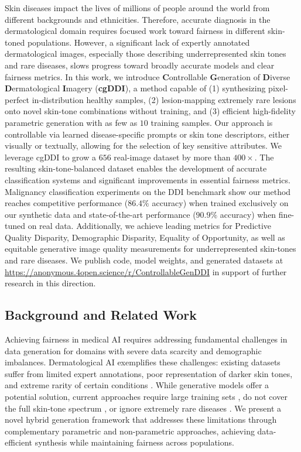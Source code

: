 \documentclass[11pt]{ucthesis}
\begin{document}
Skin diseases impact the lives of millions of people around the world from different backgrounds and ethnicities. Therefore, accurate diagnosis in the dermatological domain requires focused work toward fairness in different skin-toned populations. However, a significant lack of expertly annotated dermatological images, especially those describing underrepresented skin tones and rare diseases, slows progress toward broadly accurate models and clear fairness metrics. In this work, we introduce \textbf{C}ontrollable \textbf{G}eneration of \textbf{D}iverse \textbf{D}ermatological \textbf{I}magery (\textbf{cgDDI}), a method capable of (1) synthesizing pixel-perfect in-distribution healthy samples, (2) lesion-mapping extremely rare lesions onto novel skin-tone combinations without training, and (3) efficient high-fidelity parametric generation with as few as $10$ training samples. Our approach is controllable via learned disease-specific prompts or skin tone descriptors, either visually or textually, allowing for the selection of key sensitive attributes. We leverage cgDDI to grow a $656$ real-image dataset by more than $400\times$. The resulting skin-tone-balanced dataset enables the development of accurate classification systems and significant improvements in essential fairness metrics. Malignancy classification experiments on the DDI benchmark show our method reaches competitive performance ($86.4\%$ accuracy) when trained exclusively on our synthetic data and state-of-the-art performance ($90.9\%$ accuracy) when fine-tuned on real data. Additionally, we achieve leading metrics for Predictive Quality Disparity, Demographic Disparity, Equality of Opportunity, as well as equitable generative image quality measurements for underrepresented skin-tones and rare diseases. We publish code, model weights, and generated datasets at \url{https://anonymous.4open.science/r/ControllableGenDDI} in support of further research in this direction.

\subsection{Background and Related Work}

Achieving fairness in medical AI requires addressing fundamental challenges in data generation for domains with severe data scarcity and demographic imbalances. Dermatological AI exemplifies these challenges: existing datasets suffer from limited expert annotations, poor representation of darker skin tones, and extreme rarity of certain conditions \cite{daneshjou_2021_lack}. While generative models offer a potential solution, current approaches require large training sets \cite{ktena-2024}, do not cover the full skin-tone spectrum \cite{wang-2024}, or ignore extremely rare diseases \cite{wang-2024}. We present a novel hybrid generation framework that addresses these limitations through complementary parametric and non-parametric approaches, achieving data-efficient synthesis while maintaining fairness across populations.
\end{document}
